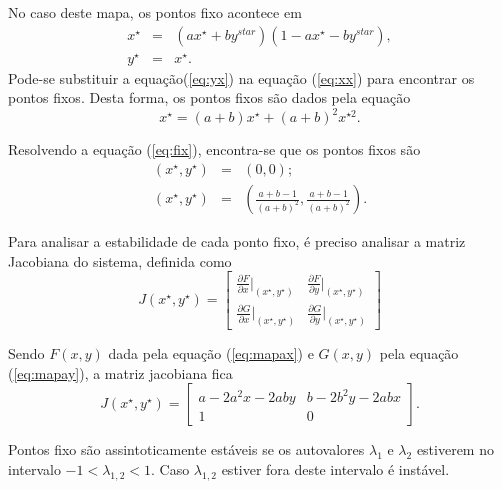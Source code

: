 \documentclass[brazilian, 12pt, a4paper, final]{article}
\begin{document}
\begin{multicols*}{2}
No caso deste mapa, os pontos fixo acontece em
\begin{eqnarray}
	x^{\star}&=&(ax^{\star}+by^{star})(1-ax^{\star}-by^{star}), \label{eq:xx} \\
	y^{\star}&=&x^{\star}. \label{eq:yx}
\end{eqnarray}
Pode-se substituir a equação(\ref{eq:yx}) na equação (\ref{eq:xx}) para encontrar os pontos fixos. Desta forma, os pontos fixos são dados pela equação
\begin{equation}\label{eq:fix}
	x^{\star}=(a+b)x^{\star}+(a+b)^{2}x^{\star 2}. 
\end{equation}

Resolvendo a equação (\ref{eq:fix}), encontra-se que os pontos fixos são
\begin{eqnarray}
	(x^{\star},y^{\star})&=&(0,0); \label{eq:fix1} \\
	(x^{\star},y^{\star})&=&\left(\frac{a+b-1}{(a+b)^2},\frac{a+b-1}{(a+b)^2}\right) \label{eq:fix2}.
\end{eqnarray}

Para analisar a estabilidade de cada ponto fixo, é preciso analisar a matriz Jacobiana do sistema, definida como
\begin{equation}
	J(x^{\star},y^{\star})= 
	\begin{bmatrix}
		\frac{\partial F}{\partial x}\big|_{(x^{\star},y^{\star})} & \frac{\partial F}{\partial y}\big|_{(x^{\star},y^{\star})} \\
		\frac{\partial G}{\partial x}\big|_{(x^{\star},y^{\star})} & \frac{\partial G}{\partial y}\big|_{(x^{\star},y^{\star})}           
	\end{bmatrix}
\end{equation}

Sendo $F(x,y)$ dada pela equação (\ref{eq:mapax}) e $G(x,y)$ pela equação (\ref{eq:mapay}), a matriz jacobiana fica
\begin{equation}
	J(x^{\star},y^{\star})= 
	\begin{bmatrix}
		a-2a^2x-2aby & b-2b^2y-2abx \\
	 	1 & 0            
	\end{bmatrix}.
\end{equation}

Pontos fixo são assintoticamente estáveis se os autovalores $\lambda_1$ e $\lambda_2$ estiverem no intervalo $-1 < \lambda_{1,2} < 1$. Caso $\lambda_{1,2}$ estiver fora deste intervalo é instável.


\end{multicols*}
\end{document}

